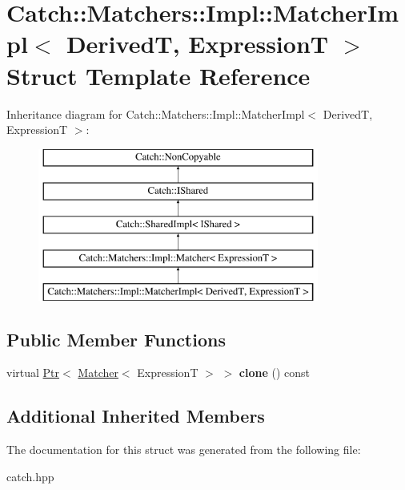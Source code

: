 \hypertarget{structCatch_1_1Matchers_1_1Impl_1_1MatcherImpl}{}\section{Catch\+:\+:Matchers\+:\+:Impl\+:\+:Matcher\+Impl$<$ DerivedT, ExpressionT $>$ Struct Template Reference}
\label{structCatch_1_1Matchers_1_1Impl_1_1MatcherImpl}
Inheritance diagram for Catch\+:\+:Matchers\+:\+:Impl\+:\+:Matcher\+Impl$<$ DerivedT, ExpressionT $>$\+:\begin{figure}[H]
\begin{center}
\leavevmode
\includegraphics[height=5.000000cm]{structCatch_1_1Matchers_1_1Impl_1_1MatcherImpl}
\end{center}
\end{figure}
\subsection*{Public Member Functions}
\begin{DoxyCompactItemize}
\item 
\mbox{\label{structCatch_1_1Matchers_1_1Impl_1_1MatcherImpl_af7cf4b7b730145d4455dc356490e6b77}} 
virtual \hyperlink{classCatch_1_1Ptr}{Ptr}$<$ \hyperlink{structCatch_1_1Matchers_1_1Impl_1_1Matcher}{Matcher}$<$ ExpressionT $>$ $>$ {\bfseries clone} () const
\end{DoxyCompactItemize}
\subsection*{Additional Inherited Members}


The documentation for this struct was generated from the following file\+:\begin{DoxyCompactItemize}
\item 
catch.\+hpp\end{DoxyCompactItemize}
